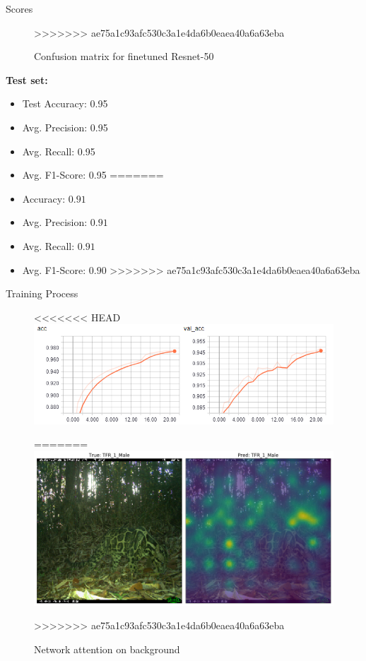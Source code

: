 \documentclass[10pt]{beamer}
\begin{document}
\begin{frame}{Scores}
\begin{minipage}[r]{0.58\linewidth}
\begin{figure}
			\caption{Confusion matrix for finetuned Resnet-50}
>>>>>>> ae75a1c93afc530c3a1e4da6b0eaea40a6a63eba
		\end{figure}
	\end{minipage}
	\begin{minipage}[c]{0.38\linewidth}
		\textbf{Test set:}
		\begin{itemize}
<<<<<<< HEAD
			\item Test Accuracy: 0.95
			\item Avg. Precision:  0.95
			\item Avg. Recall: 0.95
			\item Avg. F1-Score: 0.95
=======
			\item Accuracy: $0.91$
			\item Avg. Precision: $0.91$      
			\item Avg. Recall: $0.91$
			\item Avg. F1-Score: $0.90$
>>>>>>> ae75a1c93afc530c3a1e4da6b0eaea40a6a63eba
		\end{itemize}
	\end{minipage}
\end{frame}


\begin{frame}{Training Process}
	\centering
	\begin{figure}
<<<<<<< HEAD
		\includegraphics[width=.9\columnwidth,height=\textheight,keepaspectratio]{images/acc.png}
		\caption{Accuracy during Training}
=======
		\includegraphics[width=\columnwidth]{images/result_leo_3.png}
		\caption{Network attention on background}
>>>>>>> ae75a1c93afc530c3a1e4da6b0eaea40a6a63eba
	\end{figure}
\end{frame}
\end{document}

